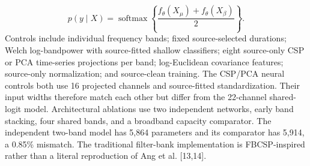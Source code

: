 \documentclass[11pt]{article}
\begin{document}
\begin{equation*}
p(y\mid X)=\operatorname{softmax}\left\{\frac{f_{\theta}(X_{\mu})+f_{\theta}(X_{\beta})}{2}\right\}.
\end{equation*}
Controls include individual frequency bands; fixed source-selected durations; Welch log-bandpower with source-fitted shallow classifiers; eight source-only CSP or PCA time-series projections per band; log-Euclidean covariance features; source-only normalization; and source-clean training. The CSP/PCA neural controls both use 16 projected channels and source-fitted standardization. Their input widths therefore match each other but differ from the 22-channel shared-logit model. Architectural ablations use two independent networks, early band stacking, four shared bands, and a broadband capacity comparator. The independent two-band model has 5,864 parameters and its comparator has 5,914, a 0.85\% mismatch. The traditional filter-bank implementation is FBCSP-inspired rather than a literal reproduction of Ang et al. [13,14].
\end{document}
